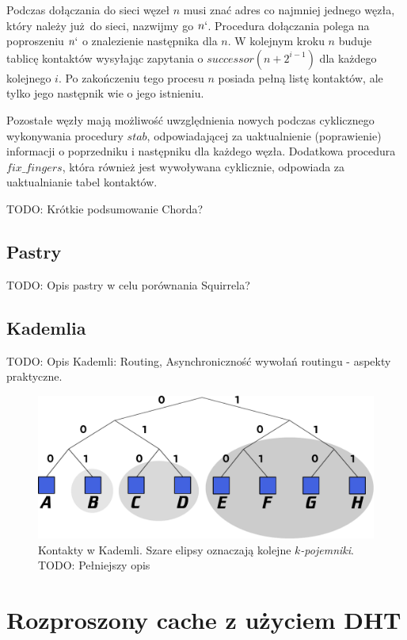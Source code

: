 \documentclass[a4paper,11pt]{scrartcl}
\newcommand{\s}{ }
\newcommand{\kesz}{cache}
\begin{document}
Podczas dołączania do sieci węzeł $n$ musi znać adres co najmniej jednego węzła, który należy już do sieci, nazwijmy go $n`$. Procedura dołączania polega na poproszeniu $n`$ o znalezienie następnika dla $n$. W kolejnym kroku $n$ buduje tablicę kontaktów wysyłając zapytania o $successor(n + 2^{i-1})$ dla każdego kolejnego $i$. Po zakończeniu tego procesu $n$ posiada pełną listę kontaktów, ale tylko jego następnik wie o jego istnieniu.

Pozostałe węzły mają możliwość uwzględnienia nowych podczas cyklicznego wykonywania procedury $stab$, odpowiadającej za uaktualnienie (poprawienie) informacji o poprzedniku i następniku dla każdego węzła. Dodatkowa procedura $fix\_fingers$, która również jest wywoływana cyklicznie, odpowiada za uaktualnianie tabel kontaktów.

TODO: Krótkie podsumowanie Chorda?

\subsection{Pastry}
TODO: Opis pastry w celu porównania Squirrela?
 
\subsection{Kademlia}
TODO: Opis Kademli\cite{maymounkov2002kademlia}: Routing, Asynchroniczność wywołań routingu - aspekty praktyczne.

\begin{figure}[h]
\centering
\includegraphics[width=0.9\linewidth]{img/kademlia.pdf}
\caption{Kontakty w Kademli. Szare elipsy oznaczają kolejne \textit{$k$-pojemniki}. 
TODO: Pełniejszy opis}
\label{fig_kademlia}
\end{figure}

\section{Rozproszony \kesz\s z użyciem DHT}
\end{document}
